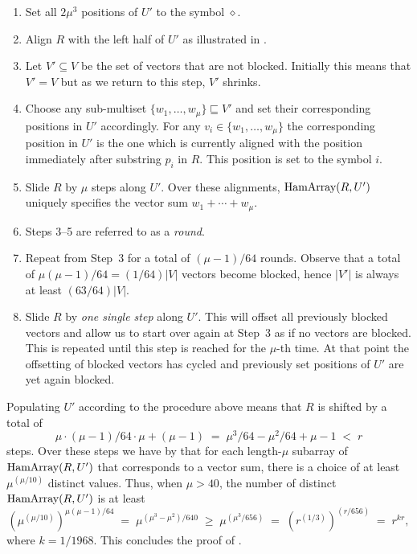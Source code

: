 \documentclass{toc}
\newcommand{\Hamarray}{\ensuremath{\textup{HamArray}}}
\newcommand{\tsymb}{\ensuremath{\diamond}}
\begin{document}
\begin{enumerate} 
	\item Set all $2\mu^3$ positions of $U'$ to the symbol $\tsymb$.
	
	\item Align $R$ with the left half of $U'$ as illustrated in .
	
	\item Let $V'\subseteq V$ be the set of vectors that are not blocked. Initially this means that $V'=V$ but as we return to this step, $V'$ shrinks.
	
	\item Choose any sub-multiset $\{w_1,\dots,w_\mu\} \sqsubseteq V'$ and set their corresponding positions in $U'$ accordingly. For any $v_i \in  \{w_1,\dots,w_\mu\} $ the corresponding position in $U'$ is the one which is currently aligned with the position immediately after substring $p_i$ in $R$.  This position is set to the symbol $i$.
	
	\item Slide $R$ by $\mu$ steps along $U'$. Over these alignments, $\Hamarray(R,U')$ uniquely specifies the vector sum $w_1+\cdots +w_\mu$.
	
	\item[~]   Steps 3--5 are referred to as a \emph{round}. 
	
	\item Repeat from Step~3 for a total of $(\mu-1)/64$ rounds. Observe that a total of $\mu(\mu-1)/64=(1/64)|V|$ vectors become blocked, hence $|V'|$ is always at least $(63/64)|V|$.
	
	\item Slide $R$ by \emph{one single step} along $U'$. This will offset all previously blocked vectors and allow us to start over again at Step~3 as if no vectors are blocked.
	This is repeated until this step is reached for the $\mu$-th time. At that point the offsetting of blocked vectors has cycled and previously set positions of $U'$ are yet again blocked.
\end{enumerate}

Populating $U'$ according to the procedure above means that $R$ is shifted by a total of
\[
\mu\cdot (\mu-1)/64 \cdot \mu + (\mu-1) \;=\; \mu^3/64 - \mu^2/64 +\mu-1 \;<\; r
\]
steps. Over these steps we have by  that for each
%
length-$\mu$  %
subarray of $\Hamarray(R,U')$ that corresponds to a vector sum, there is a choice of at least $\mu^{(\mu/10)}$ distinct values.
Thus, when $\mu>40$, the number of distinct $\Hamarray(R,U')$ is at least
\[
\left(\mu^{(\mu/10)}\right)^{ \mu(\mu-1)/64 }
\;=\;
\mu^{(\mu^3-\mu^2)/640}
\;\geq\;
\mu^{(\mu^3/656)}
\;=\;
\left(r^{(1/3)}\right)^{(r/656)}
\;=\;
r^{kr},
\]
where $k=1/1968$.
This concludes the proof of .
\end{document}
